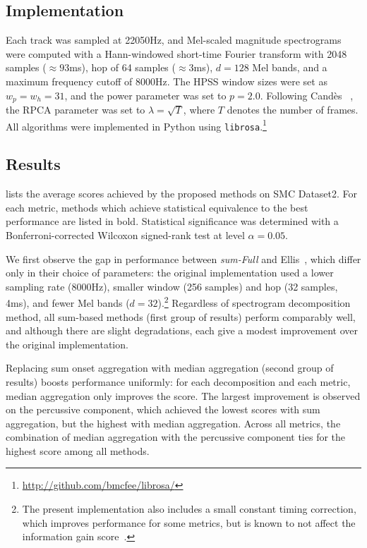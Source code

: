 \documentclass{article}
\begin{document}
\subsection{Implementation}
Each track was sampled at 22050Hz, and Mel-scaled magnitude spectrograms were computed 
with a Hann-windowed short-time Fourier transform with 2048 samples ($\approx93$ms), hop 
of 64 samples ($\approx3$ms), $d=128$ Mel bands, and a maximum frequency cutoff of 8000Hz.
The HPSS window sizes were set as $w_p = w_h = 31$, and the power parameter was set 
to $p=2.0$.
Following Cand\`{e}s \etal~\cite{candes2011robust}, the RPCA parameter was set to
${\lambda = \sqrt{T}}$, where $T$ denotes the number of frames.
All algorithms were implemented in Python using \texttt{librosa}.\footnote{\url{http://github.com/bmcfee/librosa/}}

\subsection{Results}

 lists the average scores achieved by the proposed methods on
SMC Dataset2.
For each metric, methods which achieve statistical equivalence to the best performance are listed in bold.
Statistical significance was determined with a Bonferroni-corrected Wilcoxon signed-rank test at level $\alpha=0.05$.

We first observe the gap in performance between \emph{sum-Full} and 
Ellis~\cite{ellis2007beat}, which differ only in their choice of parameters: the 
original implementation used a lower sampling rate (8000Hz), smaller window (256 samples) 
and hop (32 samples, 4ms), and fewer Mel bands ($d=32$).\footnote{The present
implementation also includes a small constant timing correction, which improves 
performance for some metrics, but is known to not affect the information gain
score~\cite{davies2009evaluation}.}
Regardless of spectrogram decomposition method, all sum-based methods (first group of 
results) perform comparably well, and although there are slight degradations, each give 
a modest improvement over the original implementation.

Replacing sum onset aggregation with median aggregation (second group of results)
boosts performance uniformly: for each decomposition and each metric, median
aggregation only improves the score.  The largest improvement is observed on the
percussive component, which achieved the lowest scores with sum aggregation, but the
highest with median aggregation. Across all metrics, the combination of median aggregation with 
the percussive component ties for the highest score among all methods.
\end{document}
